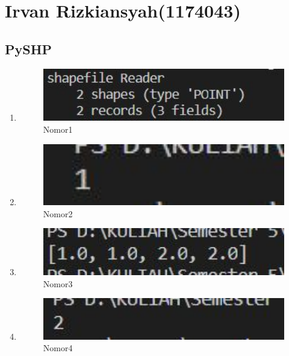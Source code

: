\section{Irvan Rizkiansyah(1174043)}
	\subsection{PySHP}
		\begin{enumerate}
			\item 
				
				\begin{figure}[H]
					\includegraphics[width=12cm]{figures/1174043/TUGAS3/1.jpg}
					\centering
					\caption{Nomor1}
				\end{figure}
			
			\item 
				
				\begin{figure}[H]
					\includegraphics[width=12cm]{figures/1174043/TUGAS3/2.jpg}
					\centering
					\caption{Nomor2}
				\end{figure}
			
			\item 
				
				\begin{figure}[H]
					\includegraphics[width=12cm]{figures/1174043/TUGAS3/3.jpg}
					\centering
					\caption{Nomor3}
				\end{figure}
			
			\item 
				
				\begin{figure}[H]
					\includegraphics[width=12cm]{figures/1174043/TUGAS3/4.jpg}
					\centering
					\caption{Nomor4}
				\end{figure}
			

\end{enumerate}

